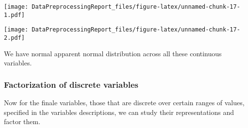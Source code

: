 \documentclass[
]{article}
\newenvironment{Shaded}{\begin{snugshade}}{\end{snugshade}}
\newcommand{\AttributeTok}[1]{\textcolor[rgb]{0.13,0.29,0.53}{#1}}
\newcommand{\DecValTok}[1]{\textcolor[rgb]{0.00,0.00,0.81}{#1}}
\newcommand{\FunctionTok}[1]{\textcolor[rgb]{0.13,0.29,0.53}{\textbf{#1}}}
\newcommand{\NormalTok}[1]{#1}
\newcommand{\SpecialCharTok}[1]{\textcolor[rgb]{0.81,0.36,0.00}{\textbf{#1}}}
\newcommand{\StringTok}[1]{\textcolor[rgb]{0.31,0.60,0.02}{#1}}
\begin{document}
\begin{Shaded}
\end{Shaded}

\texttt{[image: DataPreprocessingReport\_files/figure-latex/unnamed-chunk-17-1.pdf]}

\begin{Shaded}
\end{Shaded}

\texttt{[image: DataPreprocessingReport\_files/figure-latex/unnamed-chunk-17-2.pdf]}

We have normal apparent normal distribution across all these continuous
variables.

\hypertarget{factorization-of-discrete-variables}{%
\subsubsection{Factorization of discrete
variables}\label{factorization-of-discrete-variables}}

Now for the finale variables, those that are discrete over certain
ranges of values, specified in the variables descriptions, we can study
their representations and factor them.

\begin{Shaded}
\end{Shaded}
\end{document}

